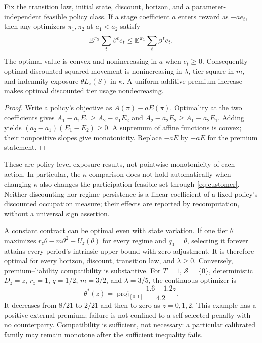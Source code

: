\begin{proposition}\label{prop:comparative}
Fix the transition law, initial state, discount, horizon, and a parameter-independent feasible policy class. If a stage coefficient $a$ enters reward as $-a e_t$, then any optimizers $\pi_1,\pi_2$ at $a_1<a_2$ satisfy
\[
 \mathbb E^{\pi_2}\sum_t\beta^t e_t\leq
 \mathbb E^{\pi_1}\sum_t\beta^t e_t.
\]
The optimal value is convex and nonincreasing in $a$ when $e_t\geq0$. Consequently optimal discounted squared movement is nonincreasing in $\lambda$, tier square in $m$, and indemnity exposure $\theta L_z(S)$ in $\kappa$. A uniform additive premium increase makes optimal discounted tier usage nondecreasing.
\end{proposition}
\begin{proof}
Write a policy's objective as $A(\pi)-a E(\pi)$. Optimality at the two coefficients gives
$A_1-a_1E_1\geq A_2-a_1E_2$ and
$A_2-a_2E_2\geq A_1-a_2E_1$.
Adding yields $(a_2-a_1)(E_1-E_2)\geq0$. A supremum of affine functions is convex; their nonpositive slopes give monotonicity. Replace $-aE$ by $+aE$ for the premium statement.\end{proof}
These are policy-level exposure results, not pointwise monotonicity of each action. In particular, the $\kappa$ comparison does not hold automatically when changing $\kappa$ also changes the participation-feasible set through \eqref{eq:customer}. Neither discounting nor regime persistence is a linear coefficient of a fixed policy's discounted occupation measure; their effects are reported by recomputation, without a universal sign assertion.

A constant contract can be optimal even with state variation. If one tier $\bar\theta$ maximizes $r_z\theta-m\theta^2+U_z(\theta)$ for every regime and $q_0=\bar\theta$, selecting it forever attains every period's intrinsic upper bound with zero adjustment. It is therefore optimal for every horizon, discount, transition law, and $\lambda\geq0$. Conversely, premium--liability compatibility is substantive. For $T=1$, $\mathcal S=\{0\}$, deterministic $D_z=z$, $r_z=1$, $q=1/2$, $m=3/2$, and $\lambda=3/5$, the continuous optimizer is
\[
 \theta^*(z)=\operatorname{proj}_{[0,1]}
          \frac{1.6-1.2z}{4.2}.
\]
It decreases from $8/21$ to $2/21$ and then to zero as $z=0,1,2$. This example has a positive external premium; failure is not confined to a self-selected penalty with no counterparty. Compatibility is sufficient, not necessary: a particular calibrated family may remain monotone after the sufficient inequality fails.

